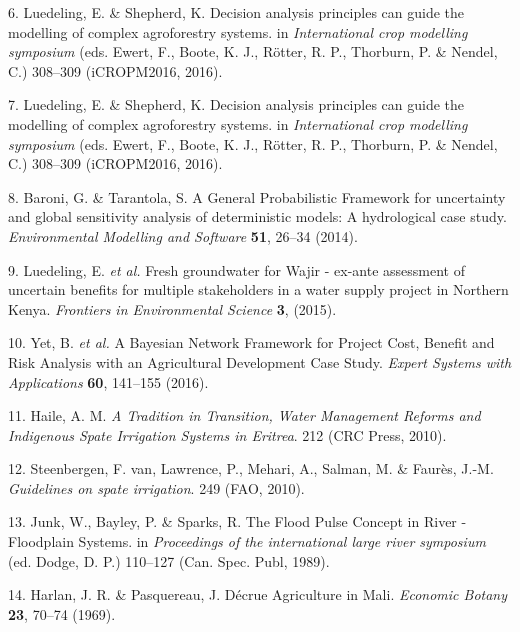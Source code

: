 \documentclass[]{elsarticle} %
\begin{document}
\leavevmode\hypertarget{ref-Luedeling_and_Shepherd_2016}{}%
6. Luedeling, E. \& Shepherd, K. Decision analysis principles can guide the modelling of complex agroforestry systems. in \emph{International crop modelling symposium} (eds. Ewert, F., Boote, K. J., Rötter, R. P., Thorburn, P. \& Nendel, C.) 308--309 (iCROPM2016, 2016).

\leavevmode\hypertarget{ref-Luedeling_and_Shepherd_2016b}{}%
7. Luedeling, E. \& Shepherd, K. Decision analysis principles can guide the modelling of complex agroforestry systems. in \emph{International crop modelling symposium} (eds. Ewert, F., Boote, K. J., Rötter, R. P., Thorburn, P. \& Nendel, C.) 308--309 (iCROPM2016, 2016).

\leavevmode\hypertarget{ref-Baroni_and_Tarantola_2014}{}%
8. Baroni, G. \& Tarantola, S. A General Probabilistic Framework for uncertainty and global sensitivity analysis of deterministic models: A hydrological case study. \emph{Environmental Modelling and Software} \textbf{51}, 26--34 (2014).

\leavevmode\hypertarget{ref-Luedeling_et_al_2015}{}%
9. Luedeling, E. \emph{et al.} Fresh groundwater for Wajir - ex-ante assessment of uncertain benefits for multiple stakeholders in a water supply project in Northern Kenya. \emph{Frontiers in Environmental Science} \textbf{3}, (2015).

\leavevmode\hypertarget{ref-Yet_et_al_2016}{}%
10. Yet, B. \emph{et al.} A Bayesian Network Framework for Project Cost, Benefit and Risk Analysis with an Agricultural Development Case Study. \emph{Expert Systems with Applications} \textbf{60}, 141--155 (2016).

\leavevmode\hypertarget{ref-Haile_2010}{}%
11. Haile, A. M. \emph{A Tradition in Transition, Water Management Reforms and Indigenous Spate Irrigation Systems in Eritrea}. 212 (CRC Press, 2010).

\leavevmode\hypertarget{ref-VanSteenbergen_et_al_2010}{}%
12. Steenbergen, F. van, Lawrence, P., Mehari, A., Salman, M. \& Faurès, J.-M. \emph{Guidelines on spate irrigation}. 249 (FAO, 2010).

\leavevmode\hypertarget{ref-Junk_et_al_1989}{}%
13. Junk, W., Bayley, P. \& Sparks, R. The Flood Pulse Concept in River - Floodplain Systems. in \emph{Proceedings of the international large river symposium} (ed. Dodge, D. P.) 110--127 (Can. Spec. Publ, 1989).

\leavevmode\hypertarget{ref-Harlan_and_Pasquereau_1969}{}%
14. Harlan, J. R. \& Pasquereau, J. Décrue Agriculture in Mali. \emph{Economic Botany} \textbf{23}, 70--74 (1969).
\end{document}
